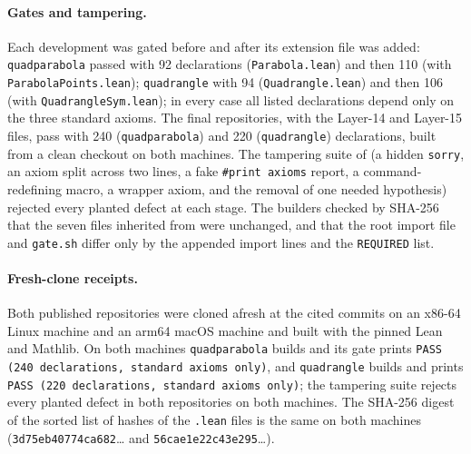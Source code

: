 \documentclass[11pt]{article}
\theoremstyle{definition}
\theoremstyle{remark}
\newcommand{\lean}[1]{\texttt{#1}}
\begin{document}
\paragraph{Gates and tampering.} Each development was gated before and after its extension file was
added: \lean{quadparabola} passed with 92 declarations (\lean{Parabola.lean}) and then 110
(with \lean{ParabolaPoints.lean}); \lean{quadrangle} with 94 (\lean{Quadrangle.lean}) and then 106
(with \lean{QuadrangleSym.lean}); in every case all listed declarations depend only on the three
standard axioms. The final repositories, with the Layer-14 and Layer-15 files, pass with 240
(\lean{quadparabola}) and 220 (\lean{quadrangle}) declarations, built from a clean checkout on both
machines. The tampering suite of \cite{paperE} (a hidden \lean{sorry}, an axiom split across
two lines, a fake \lean{\#print axioms} report, a command-redefining macro, a wrapper axiom, and the
removal of one needed hypothesis) rejected every planted defect at each stage. The builders checked
by SHA-256 that the seven files inherited from \cite{paperE} were unchanged, and that the root
import file and \lean{gate.sh} differ only by the appended import lines and the \lean{REQUIRED} list.
\paragraph{Fresh-clone receipts.} Both published repositories were cloned afresh at the cited commits on an x86-64 Linux machine and an arm64 macOS machine and built with the pinned Lean and Mathlib. On both machines \lean{quadparabola} builds and its gate prints \lean{PASS (240 declarations, standard axioms only)}, and \lean{quadrangle} builds and prints \lean{PASS (220 declarations, standard axioms only)}; the tampering suite rejects every planted defect in both repositories on both machines. The SHA-256 digest of the sorted list of hashes of the \lean{.lean} files is the same on both machines (\texttt{3d75eb40774ca682}\dots{} and \texttt{56cae1e22c43e295}\dots{}).
\end{document}
